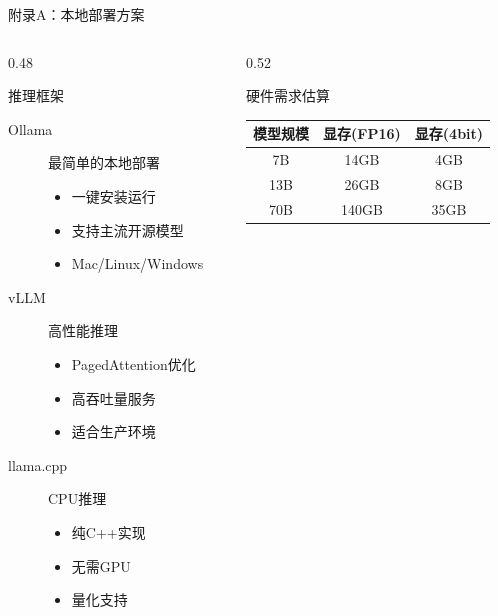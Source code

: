 \documentclass[aspectratio=169,11pt]{beamer}
\begin{document}
\begin{frame}{附录A：本地部署方案}
    \begin{columns}
        \begin{column}{0.48\textwidth}
            \begin{block}{推理框架}
                \small
                \begin{description}
                    \item[Ollama] 最简单的本地部署
                    \begin{itemize}
                        \tiny
                        \item 一键安装运行
                        \item 支持主流开源模型
                        \item Mac/Linux/Windows
                    \end{itemize}
                    \item[vLLM] 高性能推理
                    \begin{itemize}
                        \tiny
                        \item PagedAttention优化
                        \item 高吞吐量服务
                        \item 适合生产环境
                    \end{itemize}
                    \item[llama.cpp] CPU推理
                    \begin{itemize}
                        \tiny
                        \item 纯C++实现
                        \item 无需GPU
                        \item 量化支持
                    \end{itemize}
                \end{description}
            \end{block}
        \end{column}
        \begin{column}{0.52\textwidth}
            \begin{block}{硬件需求估算}
                \centering
                \small
                \begin{tabular}{ccc}
                    \toprule
                    \textbf{模型规模} & \textbf{显存(FP16)} & \textbf{显存(4bit)} \\
                    \midrule
                    7B & 14GB & 4GB \\
                    13B & 26GB & 8GB \\
                    70B & 140GB & 35GB \\
                    \bottomrule
                \end{tabular}
            \end{block}
            

\end{column}
\end{columns}
\end{frame}
\end{document}
